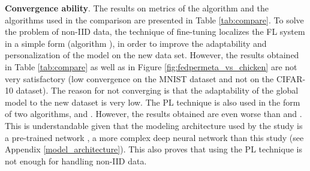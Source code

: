 \documentclass[runningheads]{llncs}
\begin{document}
\textbf{Convergence ability}. The results on metrics of the  algorithm and the algorithms used in the comparison are presented in Table \ref{tab:compare}. To solve the problem of non-IID data, the technique of fine-tuning localizes the FL system in a simple form (algorithm ), in order to improve the adaptability and personalization of the model on the new data set. However, the results obtained in Table \ref{tab:compare} as well as in Figure \ref{fig:fedpermeta_vs_chicken} are not very satisfactory (low convergence on the MNIST dataset and not on the CIFAR-10 dataset). The reason for  not converging is that the adaptability of the global model to the new dataset is very low. The PL technique is also used in the form of two algorithms,  and . However, the results obtained are even worse than  and . This is understandable given that the modeling architecture used by the \cite{arivazhagan2019federated} study is a pre-trained network  \cite{howard2017mobilenets}, a more complex deep neural network than this study (see Appendix \ref{model_architecture}). This also proves that using the PL technique is not enough for handling non-IID data.
\end{document}
